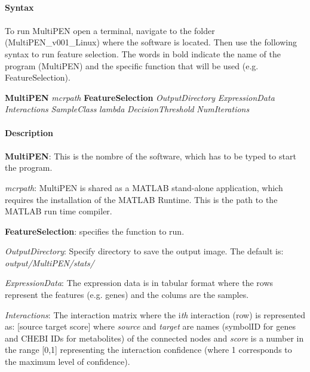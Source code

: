 \documentclass[11pt, oneside]{article}   	%
\begin{document}
\paragraph{Syntax}
\paragraph{}


To run MultiPEN open a terminal, navigate to the folder (MultiPEN\_v001\_Linux) where the software is located. Then use the following syntax to run feature selection. The words in bold indicate the name of the program (MultiPEN) and the specific function that will be used (e.g. FeatureSelection).

\begin{framed}
{\bf MultiPEN} {\it mcrpath }  {\bf FeatureSelection } {\it OutputDirectory} 
{\it ExpressionData } {\it Interactions } {\it SampleClass } {\it lambda } 
{\it DecisionThreshold } {\it NumIterations}
\end{framed}


\paragraph{Description}
\paragraph{}


{\bf MultiPEN}:  This is the nombre of the software, which has to be typed to start the program.

{\it mcrpath}: MultiPEN is shared as a MATLAB stand-alone application, which requires the installation of the MATLAB Runtime. This is the path to the MATLAB run time compiler.

{\bf FeatureSelection}: specifies the function to run.

{\it OutputDirectory}:  Specify directory to save the output image. The default is: {\it output/MultiPEN/stats/} 

{\it ExpressionData}: The expression data is in tabular format where the rows represent the features (e.g. genes) and the colums are the samples.

{\it Interactions}: The interaction matrix where the i{\it th} interaction (row) is represented as: [source target score] where {\it source} and {\it target} are names (symbolID for genes and CHEBI IDs for metabolites) of the connected nodes and {\it score} is a number in the range [0,1] representing the interaction confidence (where 1 corresponds to the maximum level of confidence).
\end{document}

